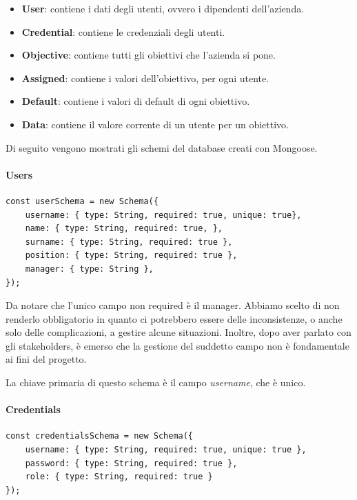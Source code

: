 \begin{itemize}
    \item \textbf{User}: contiene i dati degli utenti, ovvero i dipendenti dell'azienda.
    \item \textbf{Credential}: contiene le credenziali degli utenti.
    \item \textbf{Objective}: contiene tutti gli obiettivi che l'azienda si pone.
    \item \textbf{Assigned}: contiene i valori dell'obiettivo, per ogni utente.
    \item \textbf{Default}: contiene i valori di default di ogni obiettivo.
    \item \textbf{Data}: contiene il valore corrente di un utente per un obiettivo.
\end{itemize}

Di seguito vengono mostrati gli schemi del database creati con Mongoose.

\paragraph{Users}

\begin{verbatim}
const userSchema = new Schema({
    username: { type: String, required: true, unique: true},
    name: { type: String, required: true, },
    surname: { type: String, required: true },
    position: { type: String, required: true },
    manager: { type: String },
});
\end{verbatim}

Da notare che l'unico campo non required è il manager. Abbiamo scelto di non renderlo obbligatorio in quanto
ci potrebbero essere delle inconsistenze, o anche solo delle complicazioni, a gestire alcune situazioni.
Inoltre, dopo aver parlato con gli stakeholders, è emerso che la gestione del suddetto campo non è fondamentale 
ai fini del progetto.

La chiave primaria di questo schema è il campo \textit{username}, che è unico.

\paragraph{Credentials}

\begin{verbatim}
const credentialsSchema = new Schema({
    username: { type: String, required: true, unique: true },
    password: { type: String, required: true },
    role: { type: String, required: true }
});
\end{verbatim}

